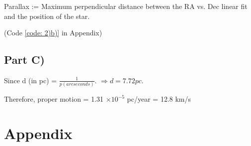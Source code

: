 \documentclass{article}
\begin{document}
        Parallax := Maximum perpendicular distance between the RA vs. Dec linear fit and the position of the star.
        
        (Code \ref{code: 2)b)} in Appendix)
    \subsection{Part C)}
        Since d (in pc) = $\frac{1}{p (arcseconds)}$.
        $\Rightarrow d = 7.72 pc$.
        
        Therefore, proper motion = 1.31 $\times 10^{-5}$ pc/year = 12.8 km/s
        
        
\section*{Appendix}
\end{document}
